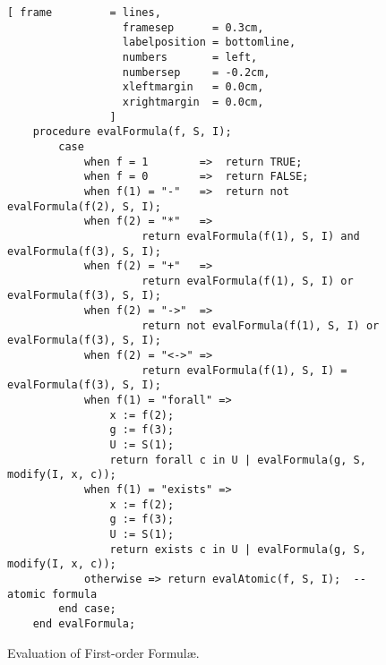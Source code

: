 \begin{figure}[!ht]
\centering
\begin{Verbatim}[ frame         = lines, 
                  framesep      = 0.3cm, 
                  labelposition = bottomline,
                  numbers       = left,
                  numbersep     = -0.2cm,
                  xleftmargin   = 0.0cm,
                  xrightmargin  = 0.0cm,
                ]
    procedure evalFormula(f, S, I);
        case
            when f = 1        =>  return TRUE;
            when f = 0        =>  return FALSE;
            when f(1) = "-"   =>  return not evalFormula(f(2), S, I);
            when f(2) = "*"   =>  
                     return evalFormula(f(1), S, I) and  evalFormula(f(3), S, I);
            when f(2) = "+"   =>  
                     return evalFormula(f(1), S, I) or   evalFormula(f(3), S, I);
            when f(2) = "->"  =>  
                     return not evalFormula(f(1), S, I) or evalFormula(f(3), S, I);
            when f(2) = "<->" =>  
                     return evalFormula(f(1), S, I) = evalFormula(f(3), S, I);
            when f(1) = "forall" =>
                x := f(2);
                g := f(3);
                U := S(1);                
                return forall c in U | evalFormula(g, S, modify(I, x, c));
            when f(1) = "exists" =>
                x := f(2);
                g := f(3);
                U := S(1);                
                return exists c in U | evalFormula(g, S, modify(I, x, c));
            otherwise => return evalAtomic(f, S, I);  -- atomic formula
        end case;        
    end evalFormula;
\end{Verbatim}
\vspace*{-0.3cm}
\caption{Evaluation of First-order Formul\ae.}
\label{fig:pl-evaluate.stl}
\end{figure}

